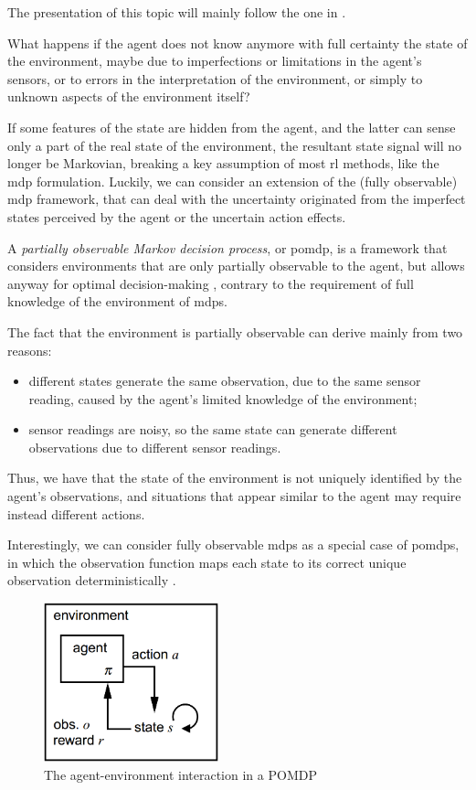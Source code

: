 The presentation of this topic will mainly follow the one in \cite{Spaan12pomdp}.

What happens if the agent does not know anymore with full certainty the state of the environment, maybe due to imperfections or limitations in the agent's sensors, or to errors in the interpretation of the environment, or simply to unknown aspects of the environment itself?

If some features of the state are hidden from the agent, and the latter can sense only a part of the real state of the environment, the resultant state signal will no longer be Markovian, breaking a key assumption of most \acrshort{rl} methods, like the \acrshort{mdp} formulation. Luckily, we can consider an extension of the (fully observable) \acrshort{mdp} framework, that can deal with the uncertainty originated from the imperfect states perceived by the agent or the uncertain action effects.

A \emph{partially observable Markov decision process}, or \acrshort{pomdp}, is a framework that considers environments that are only partially observable to the agent, but allows anyway for optimal decision-making \cite{Kaelbling1998}, contrary to the requirement of full knowledge of the environment of \acrshort{mdp}s.

The fact that the environment is partially observable can derive mainly from two reasons:
\begin{itemize}
    \item different states generate the same observation, due to the same sensor reading, caused by the agent's limited knowledge of the environment;
    \item sensor readings are noisy, so the same state can generate different observations due to different sensor readings.
\end{itemize}
Thus, we have that the state of the environment is not uniquely identified by the agent's observations, and situations that appear similar to the agent may require instead different actions.

Interestingly, we can consider fully observable \acrshort{mdp}s as a special case of \acrshort{pomdp}s, in which the observation function maps each state to its correct unique observation deterministically \cite{Poupart2010}.

\begin{figure}[ht]
    \centering
    \includegraphics[width=0.45\textwidth]{chapters/figures/POMDP-schema.png}
    \caption{The agent-environment interaction in a POMDP \cite{Spaan12pomdp}}
    \label{fig:POMDP}
\end{figure}

